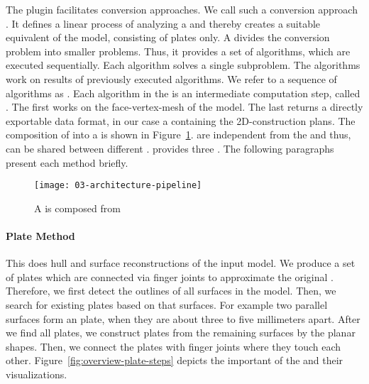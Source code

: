 \documentclass[../../ClassicThesis.tex]{subfiles}
\begin{document}
The  plugin facilitates conversion
approaches. We call such a conversion approach
\class{\fabmethod}.
It defines a linear process of analyzing a {\threedmodel}
and thereby creates a suitable equivalent of the model,
consisting of plates only. A \class{\fabmethod}
divides the conversion problem into smaller problems. Thus,
it provides a set of algorithms, which are executed
sequentially. Each algorithm solves a single subproblem. The
algorithms work on results of previously executed
algorithms. We refer to a sequence of algorithms as
. Each algorithm in the  is
an intermediate computation step, called
. The first  works
on the face-vertex-mesh of the model. The last
 returns a directly exportable data
format, in our case a {\zipfile} containing the
2D-construction plans. The composition of
 into a  is shown in
Figure~\ref{fig:pipeline-from-steps}. 
are independent from the \class{\fabmethod} and thus, can be
shared between different . {\platener}
provides three . The following paragraphs
present each method briefly.

\begin{figure}[h]
\centering
\texttt{[image: 03-architecture-pipeline]}
\caption{A  is composed from
  }
\label{fig:pipeline-from-steps}
\end{figure}

\paragraph{Plate Method}

This \class{\fabmethod} does hull and surface reconstructions of the
input model. We produce a set of plates which are connected via finger
joints to approximate the original {\threedmodel}. Therefore, we first
detect the outlines of all surfaces in the model. Then, we search for
existing plates based on that surfaces. For example two parallel
surfaces form an  plate, when they are about three to
five millimeters apart. After we find all  plates, we
construct plates from the remaining surfaces by  the
planar shapes. Then, we connect the plates with finger joints where
they touch each other. Figure~\ref{fig:overview-plate-steps} depicts
the important  of the  and
their visualizations.
\end{document}
